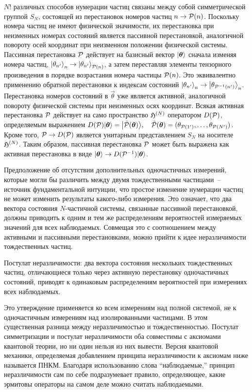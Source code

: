 \documentclass[a4paper, 12pt]{article}
\begin{document}
$N!$ различных способов нумерации частиц связаны между собой 
симметрической группой $S_N$, состоящей из перестановок номеров частиц 
$n\to{\mathcal{P}}(n)$. Поскольку номера частиц не имеют физической значимости, 
их перестановка при неизменных номерах состояний является пассивной 
перестановкой, аналогичной повороту осей координат при неизменном 
положении физической системы. Пассивная перестановка ${\mathcal{P}}$ действует 
на базисный вектор ${\left|{\boldsymbol{\theta}}{}\right\rangle}$ сначала изменяя номера частиц, 
${\left|\theta_{n'}\right\rangle}_n \to {\left|\theta_{n'}\right\rangle}_{{\mathcal{P}}(n)}$, а затем 
переставляя элементы тензорного произведения в порядке возрастания 
номера частицы ${\mathcal{P}}(n)$. Это эквивалентно применению обратной 
перестановки к индексам состояний
${\left|\theta_{n'}\right\rangle}_n \to {\left|\theta_{{\mathcal{P}}^{-1}(n')}\right\rangle}_{n}$.
Перестановка номеров состояний в $\vec{\theta}$ уже является активной, 
аналогичной повороту физической системы при неизменных осях координат. 
Всякая активная перестановка ${\mathcal{P}}$ действует на само пространство 
$\mathfrak{H}^{(N)}$ оператором $D({\mathcal{P}})$, определяемым выражением
$ D({\mathcal{P}}){\left|{\boldsymbol{\theta}}{}\right\rangle} = {\left|\tilde{{\mathcal{P}}}({\boldsymbol{\theta}}{})\right\rangle},
\quad \tilde{{\mathcal{P}}}({\boldsymbol{\theta}}{}) =
(\theta_{{\mathcal{P}}(1')}, \ldots, \theta_{{\mathcal{P}}(N')})$.
%
Кроме того, ${\mathcal{P}}\to D({\mathcal{P}})$ является унитарным представлением $S_N$ 
на носителе $\mathfrak{H}^{(N)}$. Таким образом, пассивная перестановка ${\mathcal{P}}$ 
может быть выражена как активная перестановка в виде
${\left|{\boldsymbol{\theta}}{}\right\rangle} \to D({\mathcal{P}}^{-1}){\left|{\boldsymbol{\theta}}{}\right\rangle}$.


\label{sec:paper:3}

Предположение об отсутствии дополнительных одночастичных измерений, 
которые могли бы различить между двумя тождественными частицами~-- 
источник фундаментальной интуиции, что простое изменение нумерации 
частиц не может изменить результаты какого-либо измерения. Это означает, 
что два вектора состояния $N$-частичной системы, связанные пассивной 
перестановкой, должны приводить к одним и тем же распределениям 
вероятностей измеряемых значений для всех наблюдаемых. Совмещая это 
с соотношением между активными и пассивными перестановками, можно прийти 
к идее неразличимости тождественных частиц.

Постулат неразличимости: два вектора состояния нескольких тождественных 
частиц, отличающиеся только через активную перестановку одночастичных 
состояний, приводят к одинаковым распределениям вероятностей при 
измерениях всех наблюдаемых.

Это утверждение применяется ко всем измерениям над полной системой, не 
к одночастичным измерениям над изолированными частицами. В этом 
существенная разница между неразличимостью и тождественностью. Постулат 
симметризации и постулат неразличимости оба совместимы с аксиомами 
квантовой теории, но ни один нельзя из них вывести. Версия квантовой 
механики, определяемая добавлением принципа неразличимости к аксиомам 
ниже называется ПНКМ. Благодаря использованию слова ``наблюдаемые,'' 
принцип неразличимости сам по себе подразумевает правило, определяющее, 
какие эрмитовы операторы на самом деле можно считать наблюдаемыми.
\end{document}
